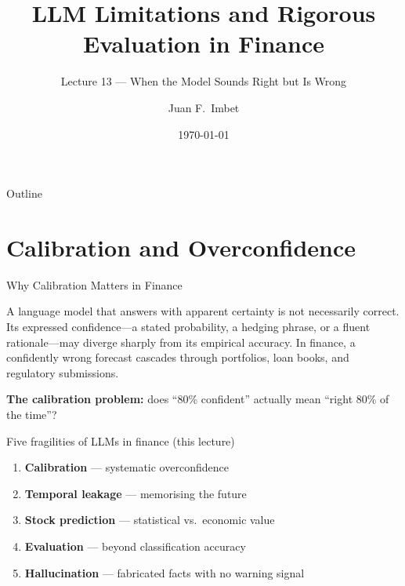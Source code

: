 \documentclass[9pt,t]{beamer}
\title{LLM Limitations and Rigorous Evaluation in Finance}
\subtitle{Lecture 13 --- When the Model Sounds Right but Is Wrong}
\author{Juan F.\ Imbet}
\institute{Paris Dauphine -- PSL University}
\date{\today}
\begin{document}
\begin{frame}
  \titlepage
\end{frame}

\begin{frame}{Outline}
  \tableofcontents
\end{frame}

\section{Calibration and Overconfidence}

\begin{frame}{Why Calibration Matters in Finance}
\begin{bigpicture}
A language model that answers with apparent certainty is not necessarily
correct. Its expressed confidence---a stated probability, a hedging phrase, or
a fluent rationale---may diverge sharply from its empirical accuracy. In
finance, a confidently wrong forecast cascades through portfolios, loan books,
and regulatory submissions.
\end{bigpicture}

\smallskip
\textbf{The calibration problem:} does ``80\% confident'' actually mean ``right
80\% of the time''?

\smallskip
\begin{block}{Five fragilities of LLMs in finance (this lecture)}
\begin{enumerate}\itemsep1pt
  \item \textbf{Calibration} --- systematic overconfidence
  \item \textbf{Temporal leakage} --- memorising the future
  \item \textbf{Stock prediction} --- statistical vs.\ economic value
  \item \textbf{Evaluation} --- beyond classification accuracy
  \item \textbf{Hallucination} --- fabricated facts with no warning signal
\end{enumerate}
\end{block}
\end{frame}
\end{document}
